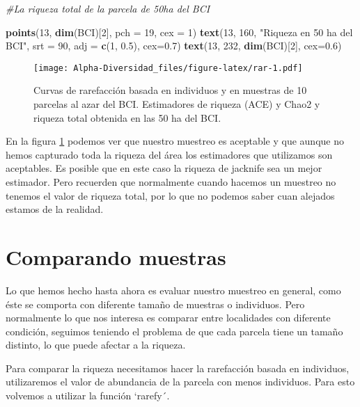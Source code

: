 \documentclass[]{book}
\newenvironment{Shaded}{\begin{snugshade}}{\end{snugshade}}
\newcommand{\KeywordTok}[1]{\textcolor[rgb]{0.13,0.29,0.53}{\textbf{{#1}}}}
\newcommand{\DataTypeTok}[1]{\textcolor[rgb]{0.13,0.29,0.53}{{#1}}}
\newcommand{\DecValTok}[1]{\textcolor[rgb]{0.00,0.00,0.81}{{#1}}}
\newcommand{\FloatTok}[1]{\textcolor[rgb]{0.00,0.00,0.81}{{#1}}}
\newcommand{\StringTok}[1]{\textcolor[rgb]{0.31,0.60,0.02}{{#1}}}
\newcommand{\CommentTok}[1]{\textcolor[rgb]{0.56,0.35,0.01}{\textit{{#1}}}}
\newcommand{\NormalTok}[1]{{#1}}
\begin{document}
\begin{Shaded}
\begin{Highlighting}[]
\CommentTok{#La riqueza total de la parcela de 50ha del BCI}

\KeywordTok{points}\NormalTok{(}\DecValTok{13}\NormalTok{, }\KeywordTok{dim}\NormalTok{(BCI)[}\DecValTok{2}\NormalTok{], }\DataTypeTok{pch =} \DecValTok{19}\NormalTok{, }\DataTypeTok{cex =} \DecValTok{1}\NormalTok{) }
\KeywordTok{text}\NormalTok{(}\DecValTok{13}\NormalTok{, }\DecValTok{160}\NormalTok{, }\StringTok{"Riqueza  en 50 ha del BCI"}\NormalTok{,}
     \DataTypeTok{srt =} \DecValTok{90}\NormalTok{, }\DataTypeTok{adj =} \KeywordTok{c}\NormalTok{(}\DecValTok{1}\NormalTok{, }\FloatTok{0.5}\NormalTok{), }\DataTypeTok{cex=}\FloatTok{0.7}\NormalTok{)}
\KeywordTok{text}\NormalTok{(}\DecValTok{13}\NormalTok{, }\DecValTok{232}\NormalTok{, }\KeywordTok{dim}\NormalTok{(BCI)[}\DecValTok{2}\NormalTok{], }\DataTypeTok{cex=}\FloatTok{0.6}\NormalTok{)}
\end{Highlighting}
\end{Shaded}

\begin{figure}[htbp]
\centering
\texttt{[image: Alpha-Diversidad\_files/figure-latex/rar-1.pdf]}
\caption{\label{fig:rar}Curvas de rarefacción basada en individuos y en
muestras de 10 parcelas al azar del BCI. Estimadores de riqueza (ACE) y
Chao2 y riqueza total obtenida en las 50 ha del BCI.}
\end{figure}

En la figura \ref{fig:rar} podemos ver que nuestro muestreo es aceptable
y que aunque no hemos capturado toda la riqueza del área los estimadores
que utilizamos son aceptables. Es posible que en este caso la riqueza de
jacknife sea un mejor estimador. Pero recuerden que normalmente cuando
hacemos un muestreo no tenemos el valor de riqueza total, por lo que no
podemos saber cuan alejados estamos de la realidad.

\chapter{Comparando muestras}\label{comparando-muestras}

Lo que hemos hecho hasta ahora es evaluar nuestro muestreo en general,
como éste se comporta con diferente tamaño de muestras o individuos.
Pero normalmente lo que nos interesa es comparar entre localidades con
diferente condición, seguimos teniendo el problema de que cada parcela
tiene un tamaño distinto, lo que puede afectar a la riqueza.

Para comparar la riqueza necesitamos hacer la rarefacción basada en
individuos, utilizaremos el valor de abundancia de la parcela con menos
individuos. Para esto volvemos a utilizar la función `rarefy´.
\end{document}
